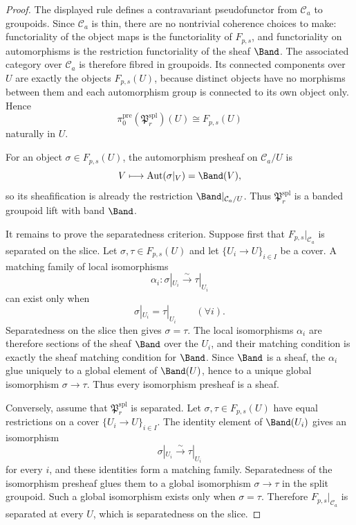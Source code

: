 \begin{proof}
The displayed rule defines a contravariant pseudofunctor from
$\mathcal C_a$ to groupoids. Since $\mathcal C_a$ is thin, there are no
nontrivial coherence choices to make: functoriality of the object maps is
the functoriality of $F_{p,s}$, and functoriality on automorphisms is the
restriction functoriality of the sheaf $\Band$. The associated category
over $\mathcal C_a$ is therefore fibred in groupoids. Its connected
components over $U$ are exactly the objects $F_{p,s}(U)$, because
distinct objects have no morphisms between them and each automorphism
group is connected to its own object only. Hence
\[
\pi_0^{\mathrm{pre}}(\mathfrak P_r^{\mathrm{spl}})(U)\cong F_{p,s}(U)
\]
naturally in $U$.

For an object $\sigma\in F_{p,s}(U)$, the automorphism presheaf on
$\mathcal C_a/U$ is
\[
V\longmapsto \operatorname{Aut}(\sigma|_V)=\Band(V),
\]
so its sheafification is already the restriction $\Band|_{\mathcal C_a/U}$.
Thus $\mathfrak P_r^{\mathrm{spl}}$ is a banded groupoid lift with band
$\Band$.

It remains to prove the separatedness criterion. Suppose first that
$F_{p,s}|_{\mathcal C_a}$ is separated on the slice. Let $\sigma,\tau\in
F_{p,s}(U)$ and let $\{U_i\to U\}_{i\in I}$ be a cover. A matching
family of local isomorphisms
\[
\alpha_i:\sigma|_{U_i}\xrightarrow{\sim}\tau|_{U_i}
\]
can exist only when
\[
\sigma|_{U_i}=\tau|_{U_i}
\qquad(\forall i).
\]
Separatedness on the slice then gives $\sigma=\tau$. The local isomorphisms
$\alpha_i$ are therefore sections of the sheaf $\Band$ over the $U_i$,
and their matching condition is exactly the sheaf matching condition for
$\Band$. Since $\Band$ is a sheaf, the $\alpha_i$ glue uniquely to a
global element of $\Band(U)$, hence to a unique global isomorphism
$\sigma\to\tau$. Thus every isomorphism presheaf is a sheaf.

Conversely, assume that $\mathfrak P_r^{\mathrm{spl}}$ is separated. Let
$\sigma,\tau\in F_{p,s}(U)$ have equal restrictions on a cover
$\{U_i\to U\}_{i\in I}$. The identity element of $\Band(U_i)$ gives an
isomorphism
\[
\sigma|_{U_i}\xrightarrow{\sim}\tau|_{U_i}
\]
for every $i$, and these identities form a matching family. Separatedness
of the isomorphism presheaf glues them to a global isomorphism
$\sigma\to\tau$ in the split groupoid. Such a global isomorphism exists
only when $\sigma=\tau$. Therefore $F_{p,s}|_{\mathcal C_a}$ is separated
at every $U$, which is separatedness on the slice.
\end{proof}

